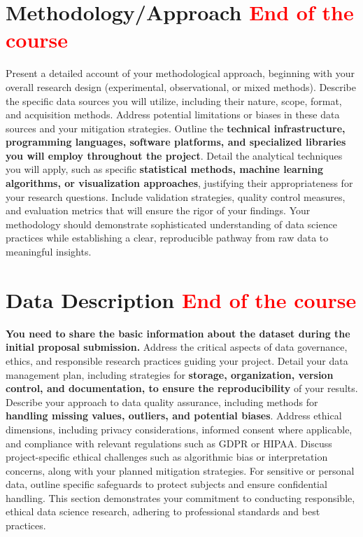 \documentclass[12pt, onecolumn]{IEEEtran}
\begin{document}
\section{Methodology/Approach \textcolor{red}{End of the course}}
Present a detailed account of your methodological approach, beginning with your overall research design (experimental, observational, or mixed methods). Describe the specific data sources you will utilize, including their nature, scope, format, and acquisition methods. Address potential limitations or biases in these data sources and your mitigation strategies. Outline the \textbf{technical infrastructure, programming languages, software platforms, and specialized libraries you will employ throughout the project}. Detail the analytical techniques you will apply, such as specific \textbf{statistical methods, machine learning algorithms, or visualization approaches}, justifying their appropriateness for your research questions. Include validation strategies, quality control measures, and evaluation metrics that will ensure the rigor of your findings. Your methodology should demonstrate sophisticated understanding of data science practices while establishing a clear, reproducible pathway from raw data to meaningful insights.

\section{Data Description \textcolor{red}{End of the course}}
\textbf{You need to share the basic information about the dataset during the initial proposal submission. }Address the critical aspects of data governance, ethics, and responsible research practices guiding your project. Detail your data management plan, including strategies for \textbf{storage, organization, version control, and documentation, to ensure the reproducibility} of your results. Describe your approach to data quality assurance, including methods for \textbf{handling missing values, outliers, and potential biases}. Address ethical dimensions, including privacy considerations, informed consent where applicable, and compliance with relevant regulations such as GDPR or HIPAA. Discuss project-specific ethical challenges such as algorithmic bias or interpretation concerns, along with your planned mitigation strategies. For sensitive or personal data, outline specific safeguards to protect subjects and ensure confidential handling. This section demonstrates your commitment to conducting responsible, ethical data science research, adhering to professional standards and best practices.
\end{document}
